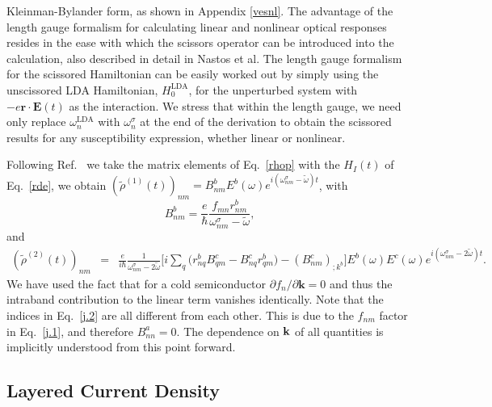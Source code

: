 \documentclass[floatfix,prb,aps,superscriptaddress,11pt,preprint,letterpaper]{revtex4}
\def\chon{black}
\begin{document}
Kleinman-Bylander 
form,\cite{francesco,mottaCMS10,kleinmanPRL82,adolphPRB96}
{\color{\chon} as shown in Appendix \ref{vesnl}.}
{\color{\chon} The} advantage of the length gauge formalism for 
{\color{\chon} calculating linear and nonlinear} optical responses 
resides in the ease with {\color{\chon} which the scissors operator
can be introduced into the calculation, also described in detail in} 
Nastos et al.\cite{nastosPRB05} {\color{\chon} The 
length gauge} formalism for the scissored Hamiltonian can be easily worked 
out by simply using the unscissored LDA Hamiltonian,
$H_0^{\mathrm{LDA}}$,
for the unperturbed system 
with $-e\mathbf{r}\cdot \mathbf{E}(t)$ as the interaction{\color{\chon}. 
We stress that within the length gauge,
we need only replace $\omega^{\mathrm{LDA}}_{n}$ with 
$\omega_{n}^{\sigma}$ at the end of the derivation}
to obtain the scissored results for any 
susceptibility expression, whether linear or nonlinear. 

Following Ref.~ {\color{\chon} we take} the
matrix elements of Eq.~\eqref{rhop} with the $H_{I}(t)$ of 
Eq.~\eqref{rde}, we obtain 
$(\tilde{\rho}^{(1)}(t))_{nm}=B_{nm}^{b}E^{b}(\omega)e^{i(\omega^\sigma_{nm}-\tilde\omega)t}$,
with 
\begin{equation}\label{j.1}
B_{nm}^{b}=\frac{e}{\hbar }\frac{f_{mn}r_{nm}^{b}}{\omega^\sigma_{nm}-\tilde\omega},
\end{equation}
and 
\begin{eqnarray}\label{j.2}
(\tilde{\rho}^{(2)}(t))_{nm} &=&\frac{e}{i\hbar }\frac{1}{\omega^\sigma_{nm}-2\tilde\omega}\bigg[
i\sum_{q }\Big(r_{nq }^{b}B_{q m}^{c}-B_{nq}^{c}r_{q m}^{b}
\Big)  
-(B_{nm}^{c})_{;k^{b}}\bigg]E^{b}(\omega)E^{c}(\omega)e^{i(\omega^\sigma_{nm}-2\tilde\omega)t}
.
\end{eqnarray}
We have used the fact that for a cold semiconductor $\partial
f_{n}/\partial \mathbf{k}=0$ and thus the intraband contribution to the linear
term vanishes identically. 
{\color{\chon} Note that the indices in Eq.~\eqref{j.2} are all} different from each
other. {\color{\chon} This is due to the $f_{nm}$ factor in Eq.~\eqref{j.1}, 
and therefore $B^a_{nn}=0$}. The dependence {\color{\chon} on} $\mathbf{k}$ 
of all quantities is implicitly understood from 
{\color{\chon} this point forward.}

\subsection{Layered Current Density}\label{cd}
\end{document}
